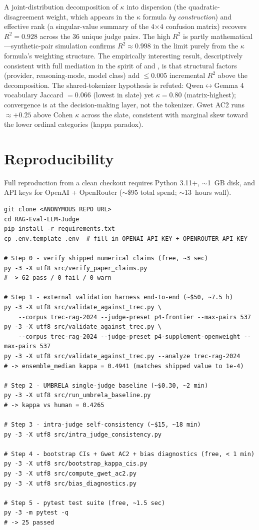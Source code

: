 \documentclass{article}
\begin{document}
A joint-distribution decomposition of $\kappa$ into dispersion (the quadratic-disagreement weight, which appears in the $\kappa$ formula \emph{by construction}) and effective rank (a singular-value summary of the 4$\times$4 confusion matrix) recovers $R^2 = 0.928$ across the 36 unique judge pairs. The high $R^2$ is partly mathematical---synthetic-pair simulation confirms $R^2 \approx 0.998$ in the limit purely from the $\kappa$ formula's weighting structure. The empirically interesting result, descriptively consistent with full mediation in the spirit of \citet{baronkenny1986} and \citet{mackinnon2007}, is that structural factors (provider, reasoning-mode, model class) add $\leq 0.005$ incremental $R^2$ above the decomposition. The shared-tokenizer hypothesis is refuted: Qwen$\leftrightarrow$Gemma 4 vocabulary Jaccard $= 0.066$ (lowest in slate) yet $\kappa = 0.80$ (matrix-highest); convergence is at the decision-making layer, not the tokenizer. Gwet AC2 runs $\approx +0.25$ above Cohen $\kappa$ across the slate, consistent with marginal skew toward the lower ordinal categories (kappa paradox).

\section{Reproducibility}\label{sec:repro}

Full reproduction from a clean checkout requires Python 3.11+, $\sim$1~GB disk, and API keys for OpenAI + OpenRouter ($\sim$\$95 total spend; $\sim$13~hours wall).

\begin{verbatim}
git clone <ANONYMOUS REPO URL>
cd RAG-Eval-LLM-Judge
pip install -r requirements.txt
cp .env.template .env  # fill in OPENAI_API_KEY + OPENROUTER_API_KEY

# Step 0 - verify shipped numerical claims (free, ~3 sec)
py -3 -X utf8 src/verify_paper_claims.py
# -> 62 pass / 0 fail / 0 warn

# Step 1 - external validation harness end-to-end (~$50, ~7.5 h)
py -3 -X utf8 src/validate_against_trec.py \
    --corpus trec-rag-2024 --judge-preset p4-frontier --max-pairs 537
py -3 -X utf8 src/validate_against_trec.py \
    --corpus trec-rag-2024 --judge-preset p4-supplement-openweight --max-pairs 537
py -3 -X utf8 src/validate_against_trec.py --analyze trec-rag-2024
# -> ensemble_median kappa = 0.4941 (matches shipped value to 1e-4)

# Step 2 - UMBRELA single-judge baseline (~$0.30, ~2 min)
py -3 -X utf8 src/run_umbrela_baseline.py
# -> kappa vs human = 0.4265

# Step 3 - intra-judge self-consistency (~$15, ~18 min)
py -3 -X utf8 src/intra_judge_consistency.py

# Step 4 - bootstrap CIs + Gwet AC2 + bias diagnostics (free, < 1 min)
py -3 -X utf8 src/bootstrap_kappa_cis.py
py -3 -X utf8 src/compute_gwet_ac2.py
py -3 -X utf8 src/bias_diagnostics.py

# Step 5 - pytest test suite (free, ~1.5 sec)
py -3 -m pytest -q
# -> 25 passed
\end{verbatim}
\end{document}
